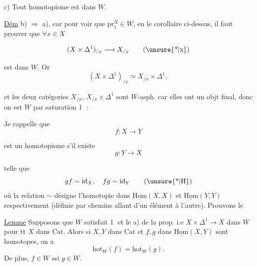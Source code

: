 c) Tout homotopisme est dans $W$. 

\uline{Dém} b) $\Rightarrow$ a), car pour voir que $\mathrm{pr}_1^X\in W$, en  le corollaire ci-dessus, il faut prouver que $\forall x\in X$

\[
(X\times\Delta^1)_{/x}\longrightarrow X_{/x}\tag*{(\unsure{*|x})}
\]

est dans $W$. Or
\[
(X\times\Delta^1)_{/x}\simeq X_{/x}\times\Delta^1,
\]


et les deux catégories $X_{/x}$, $X_{/x}\times\Delta^1$ sont $W$-asph. car elles ont un objt final, donc on est  $W$ par saturation \textcircled{1} : 



Je rappelle que
\[
f:X\longrightarrow Y
\]


est un homotopisme s'il existe  
\[
g:Y\longrightarrow X
\]

telle que
\[
gf\sim\mathrm{id}_X,\quad fg\sim\mathrm{id}_Y \tag*{(\unsure{*|H})}
\]
où la relation $\sim$ désigne l'homotopie dans $\underline{\mathrm{Hom}}(X,X)$ et $\underline{\mathrm{Hom}}(Y,Y)$ respectivement (définie par chemins allant d'un élément à l'autre). Prouvons le

\uline{Lemme} Supposons que $W$ satisfait \textcircled{1} et le a) de la prop. i.e $X\times\Delta^1\longrightarrow X$ dans $W$ pour tt $X$ dans $\mathrm{Cat}$. Alors si  $X,Y$ dans $\mathrm{Cat}$ et $f,g$ dans $\underline{\mathrm{Hom}}(X,Y)$ sont homotopes, on a
\[
\mathrm{hot}_W(f)=\mathrm{hot}_W(g).
\]
De plus,  $f\in W$ ssi $g\in W$.

